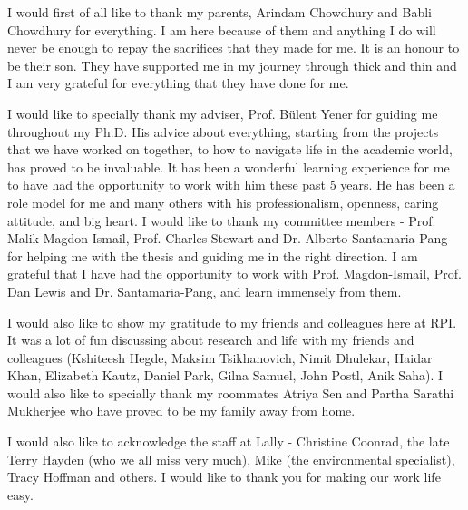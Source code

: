
I would first of all like to thank my parents, Arindam Chowdhury and Babli Chowdhury for everything. I am here because of them and anything I do will never be enough to repay the sacrifices that they made for me. It is an honour to be their son. They have supported me in my journey through thick and thin and I am very grateful for everything that they have done for me.

I would like to specially  thank my adviser, Prof. B{\"u}lent Yener for guiding me throughout my Ph.D. His advice about everything, starting from the projects that we have worked on together, to how to navigate life in the academic world, has proved to be invaluable. It has been
a wonderful learning experience for me to have had the opportunity to work with
him these past 5 years. He has been a role model for me and many others with his professionalism, openness, caring attitude, and big heart. 
I would  like to thank my committee members - Prof. Malik Magdon-Ismail, Prof. Charles Stewart and Dr. Alberto Santamaria-Pang for helping me with the thesis and guiding me in the right direction.  I am grateful that I have had the opportunity to work with  Prof.  Magdon-Ismail, Prof. Dan Lewis and Dr. Santamaria-Pang, and learn immensely from them.


I would also like to show my gratitude to my friends and colleagues here at RPI. It was a lot of fun discussing about research and life with my friends and colleagues (Kshiteesh Hegde, Maksim Tsikhanovich, Nimit Dhulekar, Haidar Khan, Elizabeth Kautz, Daniel Park, Gilna Samuel, John Postl, Anik Saha).
I would also like to specially thank my roommates Atriya Sen and Partha Sarathi Mukherjee who have proved to be my family away from home.


I would also like to acknowledge the staff at Lally - Christine Coonrad, the late Terry Hayden (who we all miss very much), Mike (the environmental specialist), Tracy Hoffman and others. I would like to thank you for making our work life easy. 